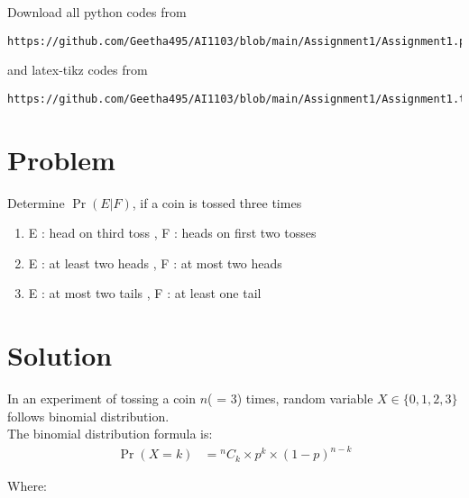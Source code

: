 \documentclass[journal,12pt,twocolumn]{IEEEtran}
\newcommand*{\Comb}[2]{{}^{#1}C_{#2}}%
\begin{document}
Download all python codes from 
\begin{lstlisting}
https://github.com/Geetha495/AI1103/blob/main/Assignment1/Assignment1.py
\end{lstlisting}
%
and latex-tikz codes from 
%
\begin{lstlisting}
https://github.com/Geetha495/AI1103/blob/main/Assignment1/Assignment1.tex
\end{lstlisting}



\section{Problem}
Determine $\Pr( E|F)$, if a coin is tossed three
times
\begin{enumerate}[label=\roman*]
    \item E : head on third toss , F : heads on first
two tosses
\item E : at least two heads , F : at most two
heads
\item E : at most two tails , F : at least one tail
\end{enumerate}



\section{Solution}
In an experiment of tossing a coin $n$( = 3) times, random variable  $X \in \lbrace 0,1,2,3 \rbrace$ follows binomial distribution.\\
The binomial distribution formula is:
\begin{align*}
 \Pr( X=k ) &= \Comb{n}{k} \times p^k \times (1- p)^{n - k}
\end{align*}

Where:


\begin{table}[h]

    \centering
\caption{The binomial distribution formula}
    \label{table:0}
\end{table}
\end{document}
